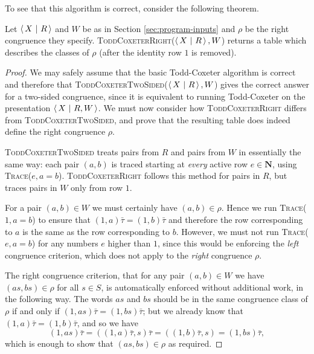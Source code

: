 To see that this algorithm is correct, consider the following theorem.

\begin{theorem}
  Let $\left\langle\,X ~\middle|~ R\,\right\rangle$ and $W$ be as in Section \ref{sec:program-inputs} and $\rho$
  be the right congruence they specify.
  \textsc{ToddCoxeterRight}($\left\langle\,X ~\middle|~ R\,\right\rangle, W$) returns a table which describes the
  classes of $\rho$ (after the identity row $1$ is removed).
  \begin{proof}
    We may safely assume that the basic Todd-Coxeter algorithm is correct
    \cite{todd_coxeter_1936, beetham_campbell_1976} and therefore that
    \textsc{ToddCoxeterTwoSided($\left\langle\,X ~\middle|~ R\,\right\rangle, W$)} gives the correct answer for a
    two-sided congruence, since it is equivalent to running Todd-Coxeter on the
    presentation $\left\langle\,X ~\middle|~ R,W\,\right\rangle$.  We must now consider how
    \textsc{ToddCoxeterRight} differs from \textsc{ToddCoxeterTwoSided}, and
    prove that the resulting table does indeed define the right congruence
    $\rho$.

    \textsc{ToddCoxeterTwoSided} treats pairs from $R$ and pairs from $W$ in
    essentially the same way: each pair $(a,b)$ is traced starting at
    \textit{every} active row $e \in \mathbf{N}$, using
    \textsc{Trace}($e, a=b$).  \textsc{ToddCoxeterRight} follows this method for
    pairs in $R$, but traces pairs in $W$ only from row $1$.

    For a pair $(a,b) \in W$ we must certainly have $(a,b) \in \rho$.  Hence we
    run \textsc{Trace($1, a=b$)} to ensure that $(1,a)\bar\tau = (1,b)\bar\tau$
    and therefore the row corresponding to $a$ is the same as the row
    corresponding to $b$.  However, we must not run \textsc{Trace($e, a=b$)} for
    any numbers $e$ higher than $1$, since this would be enforcing the
    \textit{left} congruence criterion, which does not apply to the
    \textit{right} congruence $\rho$.

    The right congruence criterion, that for any pair $(a,b) \in W$ we have
    $(as, bs) \in \rho$ for all $s \in S$, is automatically enforced without
    additional work, in the following way.  The words $as$ and $bs$ should be in
    the same congruence class of $\rho$ if and only if
    $(1, as)\bar\tau = (1, bs)\bar\tau$; but we already know that
    $(1, a)\bar\tau = (1, b)\bar\tau$, and so we have
    $$(1, as)\bar\tau
    = ((1, a)\bar\tau, s)\bar\tau
    = ((1, b)\bar\tau, s)
    = (1, bs)\bar\tau,$$
    which is enough to show that $(as, bs) \in \rho$ as required.
  \end{proof}
\end{theorem}

